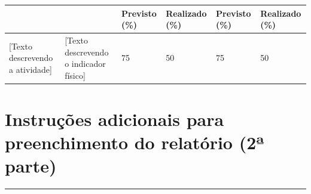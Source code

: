 \documentclass[a4paper,12pt]{article}
\begin{document}
\begin{table}[h]
{\begin{tabular}{| p{4.05cm} | p{4.5cm} | p{1.5cm} | p{1.5cm} | p{1.5cm} | p{1.5cm} |}
    \rowcolor{lightgray}
    & & \textbf{Previsto (\%)} & \textbf{Realizado (\%)} & \textbf{Previsto (\%)} & \textbf{Realizado (\%)} \\ \hline

    [Texto descrevendo a atividade] & [Texto descrevendo o indicador físico] & 75 & 50 & 75 & 50 \\ \hline
\end{tabular}}
\end{table}
\newpage

\section{Instruções adicionais para preenchimento do relatório (2ª parte)}
\vspace{-0.8cm} %
    \rule{\textwidth}{2pt} %
    
\end{document}
